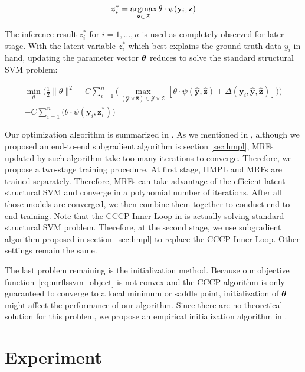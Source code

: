 \documentclass[sigconf,anonymous,review]{acmart}
\renewcommand{\cite}{\citep}
\begin{document}
\begin{align}
  {\boldsymbol{z}}_i^*=\mathop{\textrm{argmax}}_{\mathbf{z} \in \mathcal{Z}} \theta \cdot
  \psi(\mathbf{y}_i,\mathbf{z})
\end{align}

The inference result $z_i^*$ for $i=1,\dots,n$ is used as
completely observed for later stage. With the latent variable
$z_i^*$ which best explains the ground-truth data $y_i$ in hand,
updating the parameter vector $\boldsymbol{\theta}$ reduces to solve the
standard structural SVM problem:

\begin{align}
\label{eq:mrflssvm_object}
  \min_\theta\bigg(\frac{1}{2}\|\theta\|^2+
  C\sum_{i=1}^{n}\big(\max_{(\mathbf{\hat{y}} \times
  \mathbf{\hat{z}}) \in \mathcal{Y} \times \mathcal{Z}}
  [\theta\cdot\psi(\mathbf{\hat{y}},\mathbf{\hat{z}}) +
  \Delta(\mathbf{y}_i,\mathbf{\hat{y}},\mathbf{\hat{z}})]\big)\bigg)\\
  -C\sum_{i=1}^{n}\big(\theta \cdot
  \psi(\mathbf{y}_i,\mathbf{z}_i^*)\big) \nonumber
\end{align}

Our optimization algorithm is summarized in
. As we mentioned in , 
although we proposed an end-to-end
subgradient algorithm is section \ref{sec:hmpl}, MRFs updated by
such algorithm take too many iterations to converge. Therefore,
we propose a two-stage training procedure. At first stage, HMPL
and MRFs are trained separately. Therefore, MRFs can take
advantage of the efficient latent structural SVM and converge in
a polynomial number of iterations. After all those models are
converged, we then combine them together to conduct end-to-end
training. Note that the CCCP Inner Loop in 
is actually solving standard structural SVM problem. Therefore,
at the second stage, we use subgradient algorithm proposed in
section~\ref{sec:hmpl} to replace the CCCP Inner Loop. Other
settings remain the same.

The last problem remaining is the initialization method. Because
our objective function~\eqref{eq:mrflssvm_object} is not convex
and the CCCP algorithm is only guaranteed to converge to a local
minimum or saddle point\cite{yuille2002concave}, initialization
of $\boldsymbol{\theta}$ might affect the performance of our algorithm. Since
there are no theoretical solution for this problem, we propose an
empirical initialization algorithm in .


\section{Experiment}
\label{sec:exp}
\end{document}
